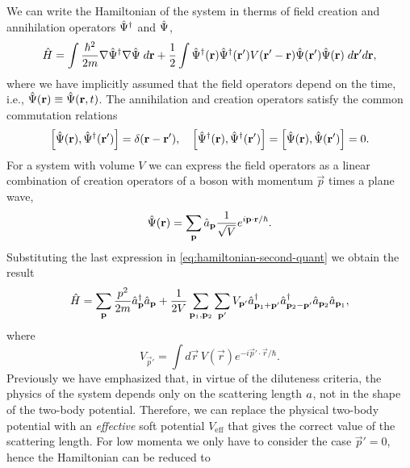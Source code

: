 We can write the Hamiltonian of the system in therms of field creation and
annihilation operators ${\hat{\Psi}}^\dagger$ and ${\hat{\Psi}}$,
%
\begin{equation}
  \label{eq:hamiltonian-second-quant}
  {\hat{H}} = \int \frac{\hbar^2}{2m}\nabla {\hat{\Psi}}^\dagger \nabla {\hat{\Psi}} \; d\mathbf r +
  \frac{1}{2}\int {\hat{\Psi}}^\dagger(\mathbf r) {\hat{\Psi}}^\dagger(\mathbf r')  V(\mathbf r' - \mathbf r) {\hat{\Psi}}(\mathbf r') {\hat{\Psi}}(\mathbf r) \; d \mathbf r' d \mathbf r,
\end{equation}
%
where we have implicitly assumed that the field operators depend on the time,
i.e., ${\hat{\Psi}}(\mathbf r) \equiv {\hat{\Psi}}(\mathbf r, t)$. The annihilation and
creation operators satisfy the common commutation relations
%
\begin{align}
  \left[ {\hat{\Psi}}(\mathbf r), {\hat{\Psi}}^\dagger(\mathbf r') \right] = \delta(\mathbf r - \mathbf r'), \quad \left[ {\hat{\Psi}}^\dagger(\mathbf r), {\hat{\Psi}}^\dagger(\mathbf r') \right] =
  \left[ {\hat{\Psi}}(\mathbf r), {\hat{\Psi}}(\mathbf r') \right] = 0.
\end{align}
%
For a system with volume $V$ we can express the field operators as a linear
combination of creation operators of a boson with momentum $\vec p$ times a
plane wave,
%
\begin{equation}
  {\hat{\Psi}}(\mathbf r) = \sum_{\mathbf p} {\hat{a}}_{\mathbf p} \frac{1}{\sqrt{V}} e^{i \mathbf p \cdot \mathbf r / \hbar}.
\end{equation}
%
Substituting the last expression in \eqref{eq:hamiltonian-second-quant} we
obtain the result
%
\begin{equation}
  {\hat{H}} = \sum_{\mathbf p} \frac{p^2}{2m} {\hat{a}}^\dagger_{\mathbf p} {\hat{a}}_{\mathbf p} +
  \frac{1}{2V} \sum_{\mathbf p_1, \mathbf p_2} \sum_{\mathbf p'} V_{\mathbf p'} {\hat{a}}^\dagger_{\mathbf p_1 + \mathbf p'} {\hat{a}}^\dagger_{\mathbf p_2 - \mathbf p'} {\hat{a}}_{\mathbf p_2} {\hat{a}}_{\mathbf p_1},
\end{equation}
%
where
%
\begin{equation}
  V_{\vec p'} = \int  d\vec r \, V(\vec r) e^{-i \vec p' \cdot \vec r / \hbar}.
\end{equation}
%
Previously we have emphasized that, in virtue of the diluteness criteria, the
physics of the system depends only on the scattering length $a$, not in the
shape of the two-body potential. Therefore, we can replace the physical two-body
potential with an \textit{effective} soft potential $V_\mathrm{eff}$ that gives
the correct value of the scattering length. For low momenta we only have to
consider the case $\vec p' = 0$, hence the Hamiltonian can be reduced to
